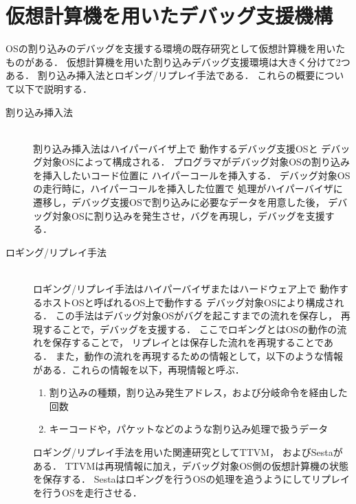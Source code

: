 \documentclass[tanilab-enum]{graduate}
\begin{document}
\section{仮想計算機を用いたデバッグ支援機構}
OSの割り込みのデバッグを支援する環境の既存研究として仮想計算機を用いたものがある．
仮想計算機を用いた割り込みデバッグ支援環境は大きく分けて2つある．
割り込み挿入法\cite{miyahara}とロギング/リプレイ\cite{samuel}\cite{kawasaki}手法である．
これらの概要について以下で説明する．
\begin{description}
    \item[割り込み挿入法]\mbox{}\\
        割り込み挿入法はハイパーバイザ上で
        動作するデバッグ支援OSと
        デバッグ対象OSによって構成される．
        プログラマがデバッグ対象OSの割り込みを挿入したいコード位置に
        ハイパーコールを挿入する．
        デバッグ対象OSの走行時に，ハイパーコールを挿入した位置で
        処理がハイパーバイザに遷移し，デバッグ支援OSで割り込みに必要なデータを用意した後，
        デバッグ対象OSに割り込みを発生させ，バグを再現し，デバッグを支援する．
    \item[ロギング/リプレイ手法]\mbox{}\\
        ロギング/リプレイ手法はハイパーバイザまたはハードウェア上で
        動作するホストOSと呼ばれるOS上で動作する
        デバッグ対象OSにより構成される．
        この手法はデバッグ対象OSがバグを起こすまでの流れを保存し，
        再現することで，デバッグを支援する．
        ここでロギングとはOSの動作の流れを保存することで，
        リプレイとは保存した流れを再現することである．
        また，動作の流れを再現するための情報として，以下のような情報
        がある．これらの情報を以下，再現情報と呼ぶ．
        \begin{enumerate}
            \item 割り込みの種類，割り込み発生アドレス，および分岐命令を経由した回数\\
            \item キーコードや，パケットなどのような割り込み処理で扱うデータ
        \end{enumerate}
        ロギング/リプレイ手法を用いた関連研究としてTTVM\cite{samuel}，
        およびSesta\cite{kawasaki}がある．
        TTVMは再現情報に加え，デバッグ対象OS側の仮想計算機の状態を保存する．
        Sestaはロギングを行うOSの処理を追うようにしてリプレイを行うOSを走行させる．

\end{description}
\end{document}

